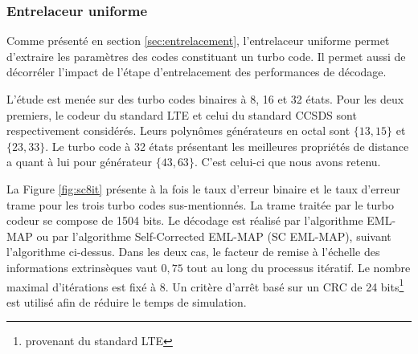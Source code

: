 \subsubsection{Entrelaceur uniforme}
Comme présenté en section \ref{sec:entrelacement}, l'entrelaceur uniforme permet d'extraire les paramètres des codes 
constituant un turbo code. Il permet aussi de décorréler l'impact de l'étape d'entrelacement des performances de 
décodage. 

L'étude est menée sur des turbo codes binaires à 8, 16 et 32 états. Pour les deux premiers, le codeur du standard LTE
et celui du standard CCSDS sont respectivement considérés. Leurs polynômes générateurs en octal sont $\{13,15\}$ et $\{23,33\}$. Le 
turbo code à 32 états présentant les meilleures propriétés de distance a quant à lui pour générateur $\{43,63\}$. C'est 
celui-ci que nous avons retenu.

La Figure \ref{fig:sc8it} présente à la fois le taux d'erreur binaire et le taux d'erreur trame pour les trois turbo 
codes sus-mentionnés. La trame traitée par le turbo codeur se compose de 1504 bits. Le décodage est réalisé par
l'algorithme EML-MAP ou par l’algorithme Self-Corrected EML-MAP (SC EML-MAP), suivant l'algorithme ci-dessus.
Dans les deux cas, le facteur de remise à l'échelle des informations extrinsèques vaut $0,75$ tout au long du processus itératif.
Le nombre maximal d'itérations est fixé à 8. Un critère d'arrêt basé sur un CRC de 24 bits\footnote{provenant du standard LTE} est utilisé afin de réduire le
temps de simulation.

